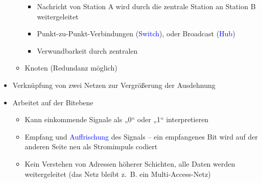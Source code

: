 \begin{itemize}
\begin{itemize}
        \begin{itemize}
            \item Nachricht von Station A wird durch die zentrale Station an Station B weitergeleitet
            \item Punkt-zu-Punkt-Verbindungen (\textcolor{blue}{Switch}), oder Broadcast (\textcolor{blue}{Hub})
            \item Verwundbarkeit durch zentralen
        \end{itemize}
        \item Knoten (Redundanz möglich)
    \end{itemize}
\end{itemize}

\begin{itemize}
    \item Verknüpfung von zwei Netzen zur Vergrößerung der Ausdehnung
    \item Arbeitet auf der Bitebene
    \begin{itemize}
        \item Kann einkommende Signale als „0“ oder „1“ interpretieren
        \item Empfang und \textcolor{blue}{Auffrischung} des Signals – ein empfangenes Bit wird auf der anderen Seite neu als Stromimpuls codiert
        \item Kein Verstehen von Adressen höherer Schichten, alle Daten werden weitergeleitet (das Netz bleibt z.\ B. ein Multi-Access-Netz)
    \end{itemize}
\end{itemize}

